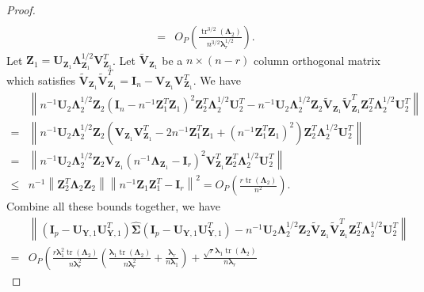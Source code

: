 \documentclass[12pt]{article} %
\DeclareMathOperator{\mytr}{tr}
\newcommand{\bZ}{\mathbf{Z}}
\newcommand{\bY}{\mathbf{Y}}
\newcommand{\bI}{\mathbf{I}}
\newcommand{\bU}{\mathbf{U}}
\newcommand{\bV}{\mathbf{V}}
\newcommand{\bfsym}[1]{\ensuremath{\boldsymbol{#1}}}
\def\blambda {\bfsym {\lambda}}
\def\bLambda {\bfsym {\Lambda}}
\def\bSigma {\bfsym {\Sigma}}
\theoremstyle{definition}
\begin{document}
\begin{appendices}
\begin{proof}
\begin{equation*}
\begin{split}
\\
=&O_P\left(\frac{\mytr^{3/2}(\bLambda_2)}{n^{3/2}\blambda_r^{1/2}}\right)
.
        \end{split}
    \end{equation*}
    Let $\bZ_1=\bU_{\bZ_1}\bLambda_{\bZ_1}^{1/2}\bV_{\bZ_1}^T$.
    Let $\tilde{\bV}_{\bZ_1}$ be a $n\times (n-r)$ column orthogonal matrix which satisfies $\tilde{\bV}_{\bZ_1}\tilde{\bV}_{\bZ_1}^T= \bI_{n}-\bV_{\bZ_1}\bV_{\bZ_1}^T$.
    We have
    \begin{equation*}
        \begin{split}
             &\left\|
             n^{-1}\bU_2 \bLambda_2^{1/2} \bZ_2 (\bI_n -n^{-1} \bZ_1^T \bZ_1)^{2} \bZ_2^T \bLambda_2^{1/2} \bU_2^T
             -
         n^{-1}\bU_2 \bLambda_2^{1/2} \bZ_2 \tilde{\bV}_{\bZ_1}\tilde{\bV}_{\bZ_1}^T  \bZ_2^T \bLambda_2^{1/2} \bU_2^T
             \right\|
             \\
             =&\left\|
             n^{-1}\bU_2 \bLambda_2^{1/2} \bZ_2 \left(\bV_{\bZ_1}\bV_{\bZ_1}^T-2n^{-1} \bZ_1^T \bZ_1+(n^{-1} \bZ_1^T \bZ_1)^2\right) \bZ_2^T \bLambda_2^{1/2} \bU_2^T
             \right\|
             \\
             =&\left\|
             n^{-1}\bU_2 \bLambda_2^{1/2} \bZ_2 \bV_{\bZ_1}\left(n^{-1} \bLambda_{\bZ_1}-\bI_r\right)^2 \bV_{\bZ_1}^T\bZ_2^T \bLambda_2^{1/2} \bU_2^T
             \right\|
             \\
             \leq &
            n^{-1}
             \left\|
              \bZ_2^T \bLambda_2 \bZ_2
             \right\|
             \left\|
             n^{-1}\bZ_1\bZ_1^T-\bI_r
             \right\|^2
             =O_P\left(\frac{r\mytr(\bLambda_2)}{n^2}\right).
        \end{split}
    \end{equation*}
    Combine all these bounds together, we have
    \begin{equation*}
        \begin{split}
             &\left\|(\bI_p -\bU_{\bY,1}\bU_{\bY,1}^T)\hat{\bSigma}(\bI_p -\bU_{\bY,1}\bU_{\bY,1}^T)
             -
         n^{-1}\bU_2 \bLambda_2^{1/2} \bZ_2 \tilde{\bV}_{\bZ_1}\tilde{\bV}_{\bZ_1}^T  \bZ_2^T \bLambda_2^{1/2} \bU_2^T
             \right\|
             \\
             =&
             O_P\left(
                    \frac{r\blambda_1^2 \mytr(\bLambda_2)}{n\blambda_r^2}
                    \left(
\frac{\blambda_1 \mytr(\bLambda_2)}{n\blambda_r^2}
+\frac{\blambda_r}{n\blambda_1}
                    \right)
                 +\frac{\sqrt{r} \blambda_1 \mytr(\bLambda_2)}{n \blambda_r}

\end{split}
\end{equation*}
\end{proof}
\end{appendices}
\end{document}

